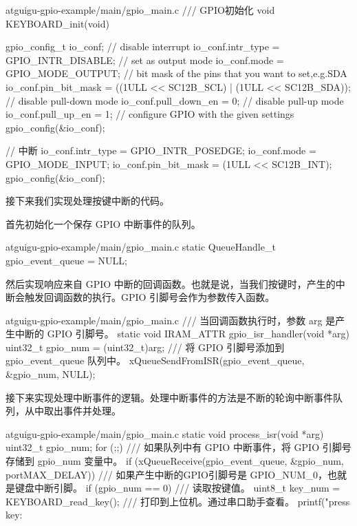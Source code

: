 \documentclass[lang=cn,newtx,10pt,scheme=chinese]{elegantbook}
\begin{document}
\begin{mycode}{atguigu-gpio-example/main/gpio\_main.c}
/// GPIO初始化
void KEYBOARD_init(void)
{
    gpio_config_t io_conf;
    // disable interrupt
    io_conf.intr_type = GPIO_INTR_DISABLE;
    // set as output mode
    io_conf.mode = GPIO_MODE_OUTPUT;
    // bit mask of the pins that you want to set,e.g.SDA
    io_conf.pin_bit_mask = ((1ULL << SC12B_SCL) | (1ULL << SC12B_SDA));
    // disable pull-down mode
    io_conf.pull_down_en = 0;
    // disable pull-up mode
    io_conf.pull_up_en = 1;
    // configure GPIO with the given settings
    gpio_config(&io_conf);

    // 中断
    io_conf.intr_type = GPIO_INTR_POSEDGE;
    io_conf.mode = GPIO_MODE_INPUT;
    io_conf.pin_bit_mask = (1ULL << SC12B_INT);
    gpio_config(&io_conf);
}
\end{mycode}

接下来我们实现处理按键中断的代码。

首先初始化一个保存 GPIO 中断事件的队列。

\begin{mycode}{atguigu-gpio-example/main/gpio\_main.c}
static QueueHandle_t gpio_event_queue = NULL;
\end{mycode}

然后实现响应来自 GPIO 中断的回调函数。也就是说，当我们按键时，产生的中断会触发回调函数的执行。GPIO 引脚号会作为参数传入函数。

\begin{mycode}{atguigu-gpio-example/main/gpio\_main.c}
/// 当回调函数执行时，参数 arg 是产生中断的 GPIO 引脚号。
static void IRAM_ATTR gpio_isr_handler(void *arg)
{
    uint32_t gpio_num = (uint32_t)arg;
    /// 将 GPIO 引脚号添加到 gpio_event_queue 队列中。
    xQueueSendFromISR(gpio_event_queue, &gpio_num, NULL);
}
\end{mycode}

接下来实现处理中断事件的逻辑。处理中断事件的方法是不断的轮询中断事件队列，从中取出事件并处理。

\begin{mycode}{atguigu-gpio-example/main/gpio\_main.c}
static void process_isr(void *arg)
{
    uint32_t gpio_num;
    for (;;)
    {
        /// 如果队列中有 GPIO 中断事件，将 GPIO 引脚号存储到 gpio_num 变量中。
        if (xQueueReceive(gpio_event_queue, &gpio_num, portMAX_DELAY))
        {
            /// 如果产生中断的GPIO引脚号是 GPIO_NUM_0，也就是键盘中断引脚。
            if (gpio_num == 0)
            {
                /// 读取按键值。
                uint8_t key_num = KEYBOARD_read_key();
                /// 打印到上位机。通过串口助手查看。
                printf("press key: %
            }
        }
    }
}
\end{mycode}
\end{document}
